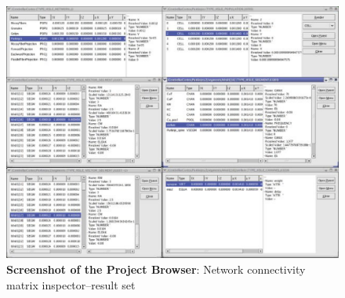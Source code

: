 \documentclass[12pt]{article}
\begin{document}
\begin{figure}[h]
  \centering
 \includegraphics[scale=0.6]{figures/screenshot-6.eps}
  \caption{{\bf Screenshot of the Project Browser}: Network connectivity matrix inspector--result set}
  \label{fig:pb-6}
\end{figure}
\end{document}
